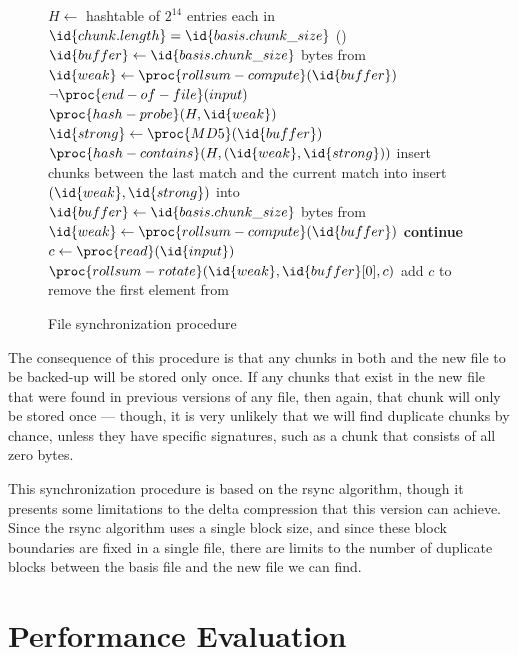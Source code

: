 \documentclass{article}
\begin{document}
\begin{figure}[ht!]
\begin{codebox}
\li \( H \gets \) hashtable of \( 2^{14} \) entries
\li \For each  in 
\li \Do\If \( \id{chunk.length} = \id{basis.chunk\_size} \)
\li   \Then {}()
      \End
    \End
\li \( \id{buffer} \gets \id{basis.chunk\_size} \) bytes from 
\li \( \id{weak} \gets \proc{rollsum-compute}(\id{buffer}) \)
\li \While \( \neg \proc{end-of-file}(input) \)
\li \Do\If \( \proc{hash-probe}(H, \id{weak}) \)
\li  \Then \( \id{strong} \gets \proc{MD5}(\id{buffer}) \)
\li    \If \( \proc{hash-contains}(H, (\id{weak}, \id{strong} ) ) \)
\li    \Then insert chunks between the last match and the
\li          current match into 
\li      insert \( (\id{weak},\id{strong}) \) into 
\li      \( \id{buffer} \gets \id{basis.chunk\_size} \) bytes from 
\li      \( \id{weak} \gets \proc{rollsum-compute}(\id{buffer}) \)
\li      \textbf{continue}
       \End
     \End
\li  \( c \gets \proc{read}(\id{input}) \)
\li  \( \proc{rollsum-rotate}(\id{weak}, \id{buffer}[0], c) \)
\li  add \( c \) to 
\li  remove the first element from 
    \End
\end{codebox}
\caption{File synchronization procedure}
\label{code:sync}
\end{figure}

The consequence of this procedure is that any chunks in both
 and the new file to be backed-up will be stored only
once. If any chunks that exist in the new file that were found in
previous versions of any file, then again, that chunk will only be
stored once --- though, it is very unlikely that we will find
duplicate chunks by chance, unless they have specific signatures, such
as a chunk that consists of all zero bytes.

This synchronization procedure is based on the rsync algorithm, though
it presents some limitations to the delta compression that this
version can achieve. Since the rsync algorithm uses a single block
size, and since these block boundaries are fixed in a single file,
there are limits to the number of duplicate blocks between the basis
file and the new file we can find.

\section{Performance Evaluation}
\end{document}
